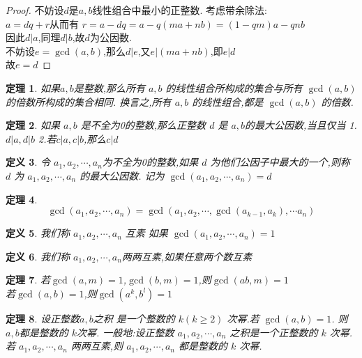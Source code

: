 \documentclass[12pt, a4paper, oneside]{ctexbook}
\newtheorem{theorem}{定理}[section]
\newtheorem{definition}[theorem]{定义}
\begin{document}
\begin{proof}
  不妨设$d$是$a,b$线性组合中最小的正整数.
  考虑带余除法:\\
  $a=dq+r$从而有
  $r=a-dq=a-q(ma+nb)=(1-qm)a-qnb$\\
  因此$d|a$,同理$d|b$,故$d$为公因数.\\
  不妨设$e=\gcd(a,b)$,那么$d|e$,又$e|(ma+nb)$,即$e|d$\\
  故$e=d$
\end{proof}

\begin{theorem}
  如果$a,b$是整数,那么所有 $a,b$ 的线性组合所构成的集合与所有
  $\gcd(a,b)$  的倍数所构成的集合相同.
  换言之,所有 $a,b$ 的线性组合,都是 $\gcd(a,b)$ 的倍数.
\end{theorem}

\begin{theorem}
  如果 $a,b$ 是不全为0的整数,那么正整数 $d$ 是 $a,b$的最大公因数,当且仅当
  1.$d|a,d|b$
  2.若$c|a,c|b$,那么$c|d$
\end{theorem}

\begin{definition}
  令 $a_1,a_2,\cdots ,a_n$为不全为0的整数,如果 $d$
 为他们公因子中最大的一个,则称 $d$
 为 $a_1,a_2,\cdots ,a_n$ 的最大公因数.
记为
  $ \gcd(a_1,a_2,\cdots ,a_n)=d$

\end{definition}

\begin{theorem}
$$
\gcd(a_1,a_2,\cdots ,a_n)=\gcd(a_1,a_2,\cdots, \gcd(a_{k-1},a_k),\cdots a_n)
$$
\end{theorem}


\begin{definition}
  我们称 $a_1,a_2,\cdots ,a_n $ 互素 如果 $ \gcd(a_1,a_2,\cdots ,a_n)=1$
\end{definition}

\begin{definition}
  我们称 $a_1,a_2,\cdots ,a_n $两两互素,如果任意两个数互素
\end{definition}

\begin{theorem}
  若$\gcd(a,m)=1$,$\gcd(b,m)=1$,则$\gcd(ab,m)=1$\\
  若$\gcd(a,b)=1$,则$\gcd(a^k,b^l)=1$
\end{theorem}

\begin{theorem}
  设正整数$a,b$之积 是一个整数的 $k(k\ge 2)$ 次幂.若
  $\gcd(a,b)=1$. 则 $a,b$都是整数的  $k$次幂.
  一般地:设正整数 $ a_1,a_2,\cdots ,a_n $ 之积是一个正整数的 $k$ 次幂.若 
  $a_1,a_2,\cdots ,a_n$ 两两互素,则 $a_1,a_2,\cdots ,a_n$
 都是整数的 $k$
 次幂.
\end{theorem}
\end{document}
